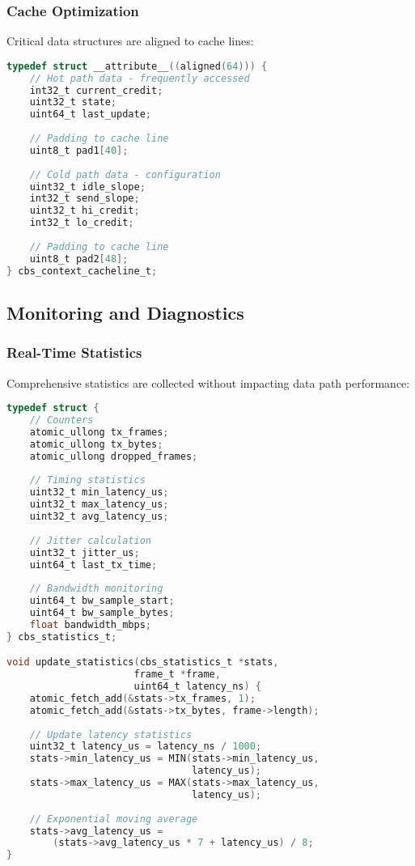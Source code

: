 \documentclass[10pt, journal, compsoc]{IEEEtran}
\begin{document}
\subsubsection{Cache Optimization}

Critical data structures are aligned to cache lines:

\begin{lstlisting}[language=C, caption=Cache-Aligned Structures]
typedef struct __attribute__((aligned(64))) {
    // Hot path data - frequently accessed
    int32_t current_credit;
    uint32_t state;
    uint64_t last_update;
    
    // Padding to cache line
    uint8_t pad1[40];
    
    // Cold path data - configuration
    uint32_t idle_slope;
    int32_t send_slope;
    uint32_t hi_credit;
    int32_t lo_credit;
    
    // Padding to cache line
    uint8_t pad2[48];
} cbs_context_cacheline_t;
\end{lstlisting}

\subsection{Monitoring and Diagnostics}

\subsubsection{Real-Time Statistics}

Comprehensive statistics are collected without impacting data path performance:

\begin{lstlisting}[language=C, caption=Statistics Collection]
typedef struct {
    // Counters
    atomic_ullong tx_frames;
    atomic_ullong tx_bytes;
    atomic_ullong dropped_frames;
    
    // Timing statistics
    uint32_t min_latency_us;
    uint32_t max_latency_us;
    uint32_t avg_latency_us;
    
    // Jitter calculation
    uint32_t jitter_us;
    uint64_t last_tx_time;
    
    // Bandwidth monitoring
    uint64_t bw_sample_start;
    uint64_t bw_sample_bytes;
    float bandwidth_mbps;
} cbs_statistics_t;

void update_statistics(cbs_statistics_t *stats,
                      frame_t *frame,
                      uint64_t latency_ns) {
    atomic_fetch_add(&stats->tx_frames, 1);
    atomic_fetch_add(&stats->tx_bytes, frame->length);
    
    // Update latency statistics
    uint32_t latency_us = latency_ns / 1000;
    stats->min_latency_us = MIN(stats->min_latency_us,
                                latency_us);
    stats->max_latency_us = MAX(stats->max_latency_us,
                                latency_us);
    
    // Exponential moving average
    stats->avg_latency_us = 
        (stats->avg_latency_us * 7 + latency_us) / 8;
}
\end{lstlisting}
\end{document}
